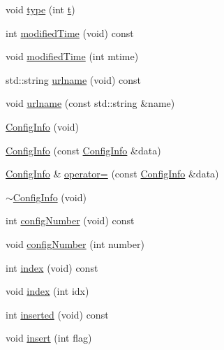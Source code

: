 \begin{DoxyCompactItemize}
void \mbox{\hyperlink{classFILEDB_1_1ConfigInfo_a8d65b3b00e90f7daa4ab65fae36ed024}{type}} (int \mbox{\hyperlink{adat__devel_2lib_2hadron_2hadron__timeslice_8cc_ac310d9181e916ba43604099aee272c71}{t}})
\item 
int \mbox{\hyperlink{classFILEDB_1_1ConfigInfo_a03212f15d26edbae21ea53bbce2b1793}{modified\+Time}} (void) const
\item 
void \mbox{\hyperlink{classFILEDB_1_1ConfigInfo_a5c250fc2d94faafa05f18d8126ccf0cb}{modified\+Time}} (int mtime)
\item 
std\+::string \mbox{\hyperlink{classFILEDB_1_1ConfigInfo_a2ed44f5e85fa1b69bb30fcad8cf71fa3}{urlname}} (void) const
\item 
void \mbox{\hyperlink{classFILEDB_1_1ConfigInfo_a49750ae80347780d48415cb7aac9a068}{urlname}} (const std\+::string \&name)
\item 
\mbox{\hyperlink{classFILEDB_1_1ConfigInfo_a5aa818d39aeb907f27e064cab48c3522}{Config\+Info}} (void)
\item 
\mbox{\hyperlink{classFILEDB_1_1ConfigInfo_aa36d3fc640cd713ac561f89483c1b5f9}{Config\+Info}} (const \mbox{\hyperlink{classFILEDB_1_1ConfigInfo}{Config\+Info}} \&data)
\item 
\mbox{\hyperlink{classFILEDB_1_1ConfigInfo}{Config\+Info}} \& \mbox{\hyperlink{classFILEDB_1_1ConfigInfo_addda23bfc94267dee10eb00355316514}{operator=}} (const \mbox{\hyperlink{classFILEDB_1_1ConfigInfo}{Config\+Info}} \&data)
\item 
\mbox{\hyperlink{classFILEDB_1_1ConfigInfo_a26e3e1b90a453aac1419e42e7b13ce05}{$\sim$\+Config\+Info}} (void)
\item 
int \mbox{\hyperlink{classFILEDB_1_1ConfigInfo_ae4526dad4c6de972b1eb25ee8cd11c67}{config\+Number}} (void) const
\item 
void \mbox{\hyperlink{classFILEDB_1_1ConfigInfo_a226c79a0ee78d03894cfb6b7ed207992}{config\+Number}} (int number)
\item 
int \mbox{\hyperlink{classFILEDB_1_1ConfigInfo_a1ea886d3469211d480bf2c26d474c365}{index}} (void) const
\item 
void \mbox{\hyperlink{classFILEDB_1_1ConfigInfo_a150cd1f4438ac651aef387d251506dc7}{index}} (int idx)
\item 
int \mbox{\hyperlink{classFILEDB_1_1ConfigInfo_a45cc2aa85de0ccd89c06989bb9cff843}{inserted}} (void) const
\item 
void \mbox{\hyperlink{classFILEDB_1_1ConfigInfo_a59ae164a1b55687a88e37d876c4f05f6}{insert}} (int flag)
\item 

\end{DoxyCompactItemize}
